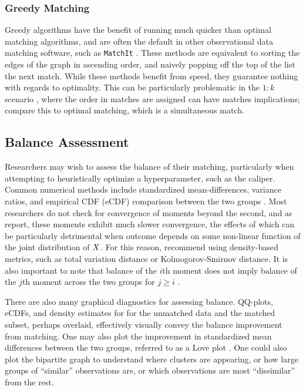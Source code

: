 \documentclass[11pt]{extarticle}
\begin{document}
\subsubsection{Greedy Matching}

Greedy algorithms have the benefit of running much quicker than optimal matching algorithms, and are often the default in other observational data matching software, such as \texttt{MatchIt} \parencite{ho_matchit_2011}. These methods are equivalent to sorting the edges of the graph in ascending order, and naively popping off the top of the list the next match. While these methods benefit from speed, they guarantee nothing with regards to optimality. This can be particularly problematic in the $1:k$ scenario \parencite{rosenbaum_optimal_1989}, where the order in matches are assigned can have matches implications; compare this to optimal matching, which is a simultaneous match.

\subsection{Balance Assessment}

Researchers may wish to assess the balance of their matching, particularly when attempting to heuristically optimize a hyperparameter, such as the caliper. Common numerical methods include standardized mean-differences, variance ratios, and empirical CDF (eCDF) comparison between the two groups \parencite{greifer_assessing_2022}. Most researchers do not check for convergence of moments beyond the second, and as \textcite{basu_use_2008} report, these moments exhibit much slower convergence, the effects of which can be particularly detrimental when outcome depends on some non-linear function of the joint distribution of $X$. For this reason, \textcite{zhu_kernel-based_2018} recommend using density-based metrics, such as total variation distance or Kolmogorov-Smirnov distance. It is also important to note that balance of the $i$th moment does not imply balance of the $j$th moment across the two groups for $j \geq i$ \parencite{garrido_methods_2014}.

There are also many graphical diagnostics for assessing balance. QQ-plots, eCDFs, and density estimates for for the unmatched data and the matched subset, perhaps overlaid, effectively visually convey the balance improvement from matching. One may also plot the improvement in standardized mean differences between the two groups, referred to as a Love plot \parencite{greifer_assessing_2022}. One could also plot the bipartite graph to understand where clusters are appearing, or how large groups of ``similar'' observations are, or which observations are most ``dissimilar'' from the rest.
\end{document}
